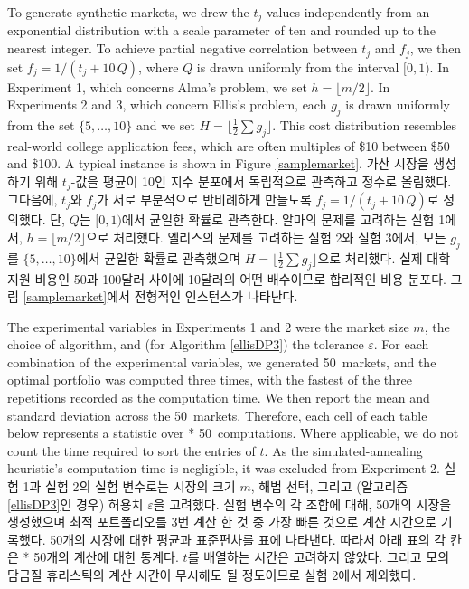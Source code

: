 \documentclass[11pt]{article} %
\theoremstyle{definition}
\theoremstyle{definition}
\begin{document}
\def\nmarkets{50}
\ifen
To generate synthetic markets, we drew the $t_j$-values independently from an exponential distribution with a scale parameter of ten and rounded up to the nearest integer. To achieve partial negative correlation between $t_j$ and $f_j$, we then set $f_j = 1 / (t_j + 10\,Q)$, where $Q$ is drawn uniformly from the interval $[0, 1)$. In Experiment 1, which concerns Alma's problem, we set $h = \lfloor m/ 2 \rfloor$. In Experiments 2 and 3, which concern Ellis's problem, each $g_j$ is drawn uniformly from the set $\{5, \dots, 10\}$ and we set $H = \lfloor \frac{1}{2} \sum g_j \rfloor$. This cost distribution resembles real-world college application fees, which are often multiples of \$10 between \$50 and \$100. A typical instance is shown in Figure \ref{samplemarket}.
\else
가산 시장을 생성하기 위해 $t_j$-값을 평균이 10인 지수 분포에서 독립적으로 관측하고 정수로 올림했다. 그다음에, $t_j$와 $f_j$가 서로 부분적으로 반비례하게 만들도록 $f_j = 1 / (t_j + 10\,Q)$로 정의했다. 단, $Q$는 $[0, 1)$에서 균일한 확률로 관측한다. 알마의 문제를 고려하는 실험 1에서, $h = \lfloor m/ 2 \rfloor$으로 처리했다. 엘리스의 문제를 고려하는 실험 2와 실험 3에서, 모든  $g_j$를 $\{5, \dots, 10\}$에서 균일한 확률로 관측했으며 $H = \lfloor \frac{1}{2} \sum g_j \rfloor$으로 처리했다. 실제 대학 지원 비용인 50과 100달러 사이에 10달러의 어떤 배수이므로 합리적인 비용 분포다. 그림 \ref{samplemarket}에서 전형적인 인스턴스가 나타난다.
\fi

\ifen
The experimental variables in Experiments 1 and 2 were the market size $m$, the choice of algorithm, and (for Algorithm \ref{ellisDP3}) the tolerance $\varepsilon$. For each combination of the experimental variables, we generated \nmarkets~markets, and the optimal portfolio was computed three times, with the fastest of the three repetitions recorded as the computation time. We then report the mean and standard deviation across the \nmarkets~markets. Therefore, each cell of each table below represents a statistic over {\the{} * \nmarkets \relax}~computations. Where applicable, we do not count the time required to sort the entries of $t$. As the simulated-annealing heuristic's computation time is negligible, it was excluded from Experiment 2. 
\else
실험 1과 실험 2의 실험 변수로는 시장의 크기 $m$, 해법 선택, 그리고 (알고리즘 \ref{ellisDP3}인 경우) 허용치 $\varepsilon$을 고려했다. 실험 변수의 각 조합에 대해,  \nmarkets 개의 시장을 생성했으며 최적 포트폴리오를 3번 계산 한 것 중 가장 빠른 것으로 계산 시간으로 기록했다. \nmarkets 개의 시장에 대한 평균과 표준편차를 표에 나타낸다. 따라서 아래 표의 각 칸은 {\the{} * \nmarkets \relax}개의 계산에 대한 통계다. $t$를 배열하는 시간은 고려하지 않았다. 그리고 모의 담금질 휴리스틱의 계산 시간이 무시해도 될 정도이므로 실험 2에서 제외했다. 
\fi
\end{document}
